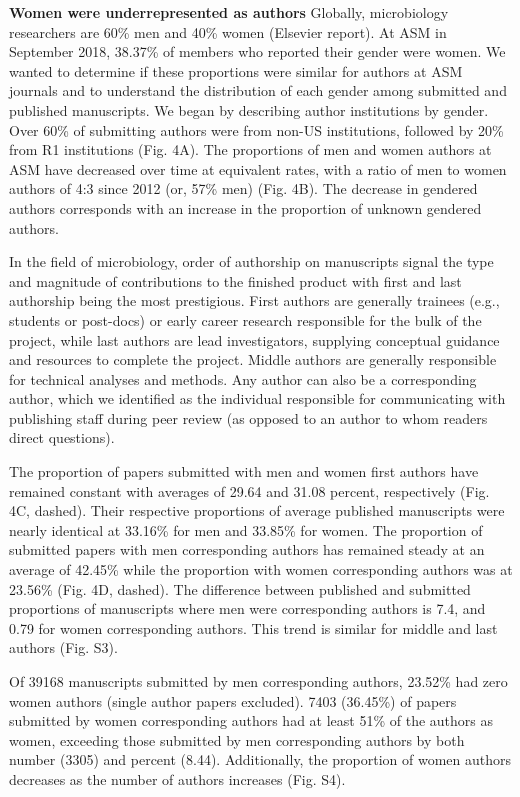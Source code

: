 \documentclass[11pt,]{article}
\begin{document}
\textbf{Women were underrepresented as authors} Globally, microbiology
researchers are 60\% men and 40\% women (Elsevier report). At ASM in
September 2018, 38.37\% of members who reported their gender were women.
We wanted to determine if these proportions were similar for authors at
ASM journals and to understand the distribution of each gender among
submitted and published manuscripts. We began by describing author
institutions by gender. Over 60\% of submitting authors were from non-US
institutions, followed by 20\% from R1 institutions (Fig. 4A). The
proportions of men and women authors at ASM have decreased over time at
equivalent rates, with a ratio of men to women authors of 4:3 since 2012
(or, 57\% men) (Fig. 4B). The decrease in gendered authors corresponds
with an increase in the proportion of unknown gendered authors.

In the field of microbiology, order of authorship on manuscripts signal
the type and magnitude of contributions to the finished product with
first and last authorship being the most prestigious. First authors are
generally trainees (e.g., students or post-docs) or early career
research responsible for the bulk of the project, while last authors are
lead investigators, supplying conceptual guidance and resources to
complete the project. Middle authors are generally responsible for
technical analyses and methods. Any author can also be a corresponding
author, which we identified as the individual responsible for
communicating with publishing staff during peer review (as opposed to an
author to whom readers direct questions).

The proportion of papers submitted with men and women first authors have
remained constant with averages of 29.64 and 31.08 percent, respectively
(Fig. 4C, dashed). Their respective proportions of average published
manuscripts were nearly identical at 33.16\% for men and 33.85\% for
women. The proportion of submitted papers with men corresponding authors
has remained steady at an average of 42.45\% while the proportion with
women corresponding authors was at 23.56\% (Fig. 4D, dashed). The
difference between published and submitted proportions of manuscripts
where men were corresponding authors is 7.4, and 0.79 for women
corresponding authors. This trend is similar for middle and last authors
(Fig. S3).

Of 39168 manuscripts submitted by men corresponding authors, 23.52\% had
zero women authors (single author papers excluded). 7403 (36.45\%) of
papers submitted by women corresponding authors had at least 51\% of the
authors as women, exceeding those submitted by men corresponding authors
by both number (3305) and percent (8.44). Additionally, the proportion
of women authors decreases as the number of authors increases (Fig. S4).
\end{document}
